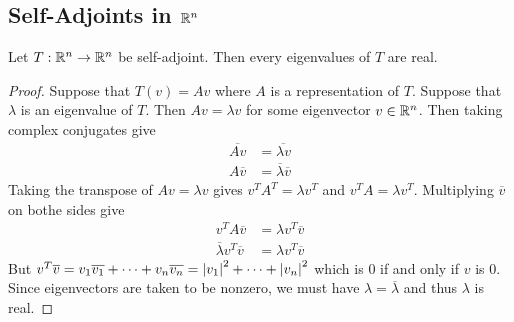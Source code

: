 \documentclass[a4paper]{article}
\begin{document}
\subsection{Self-Adjoints in $\mathbb{R}^n$}
\begin{prp}{}{} Let $T:\mathbb{R}^n\to\mathbb{R}^n$ be self-adjoint. Then every eigenvalues of $T$ are real. \tcbline
\begin{proof}
Suppose that $T(v)=Av$ where $A$ is a representation of $T$. Suppose that $\lambda$ is an eigenvalue of $T$. Then $Av=\lambda v$ for some eigenvector $v\in\mathbb{R}^n$. Then taking complex conjugates give 
\begin{align*}
\overline{Av}&=\overline{\lambda v}\\
A\overline{v}&=\overline{\lambda}\overline{v}
\end{align*}
Taking the transpose of $Av=\lambda v$ gives $v^TA^T=\lambda v^T$ and $v^TA=\lambda v^T$. Multiplying $\overline{v}$ on bothe sides give 
\begin{align*}
v^TA\overline{v}&=\lambda v^T\overline{v}\\
\overline{\lambda}v^T\overline{v}&=\lambda v^T\overline{v}
\end{align*}
But $v^T\overline{v}=v_1\overline{v_1}+\dots+v_n\overline{v_n}=\abs{v_1}^2+\dots+\abs{v_n}^2$ which is $0$ if and only if $v$ is $0$. Since eigenvectors are taken to be nonzero, we must have $\lambda=\overline{\lambda}$ and thus $\lambda$ is real. 
\end{proof}
\end{prp}
\end{document}

